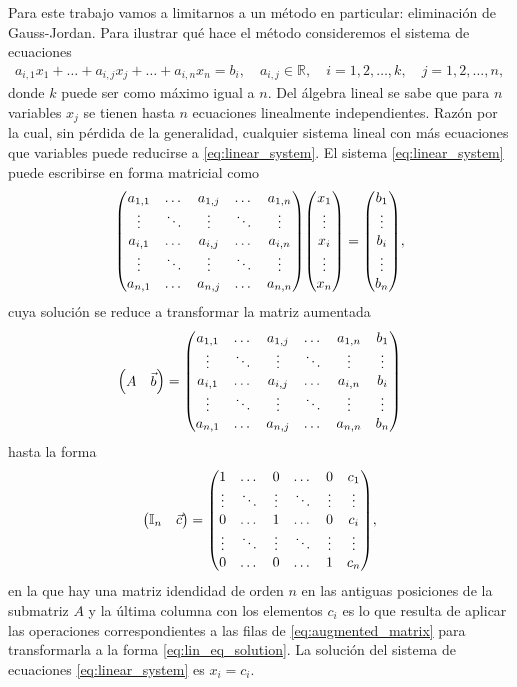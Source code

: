 \documentclass[11pt,letterpaper]{article}
\begin{document}
Para este trabajo vamos a limitarnos a un método en particular: eliminación de
Gauss-Jordan. Para ilustrar qué hace el método consideremos el sistema de ecuaciones
\begin{align}\label{eq:linear_system}
a_{i,1}x_1+\ldots+a_{i,j}x_j+\ldots+a_{i,n}x_n=b_{i}, 
\quad a_{i,j}\in \mathbb{R},\quad
i=1,2,\ldots,k,\quad j=1,2,\ldots,n,
\end{align}
donde $k$ puede ser como máximo igual a $n$.
Del álgebra lineal se sabe que para $n$ variables $x_j$ se tienen hasta $n$
ecuaciones linealmente independientes. Razón por la cual, sin pérdida de la
generalidad, cualquier sistema lineal con más ecuaciones que variables puede
reducirse a \eqref{eq:linear_system}. El sistema \eqref{eq:linear_system}
puede escribirse en forma matricial como 
\begin{align}
\mqty(a_{1,1}&\dots&a_{1,j}&\dots&a_{1,n}\\
\vdots&\ddots&\vdots&\ddots&\vdots\\
a_{i,1}&\dots&a_{i,j}&\dots&a_{i,n}\\
\vdots&\ddots&\vdots&\ddots&\vdots\\
a_{n,1}&\dots&a_{n,j}&\dots&a_{n,n})
\mqty(x_1\\ \vdots\\ x_i\\ \vdots\\ x_n)=
\mqty(b_1\\ \vdots\\ b_i\\ \vdots\\ b_n),
\end{align}
cuya solución se reduce a transformar la matriz aumentada
\begin{align}\label{eq:augmented_matrix}
\mqty(A&\vec b)=\mqty(a_{1,1}&\dots&a_{1,j}&\dots&a_{1,n}&b_1\\
\vdots&\ddots&\vdots&\ddots&\vdots&\vdots\\
a_{i,1}&\dots&a_{i,j}&\dots&a_{i,n}&b_i\\
\vdots&\ddots&\vdots&\ddots&\vdots&\vdots\\
a_{n,1}&\dots&a_{n,j}&\dots&a_{n,n}&b_n)
\end{align}
hasta la forma
\begin{align}\label{eq:lin_eq_solution}
\mqty(\mathbb{I}_n&\vec c)=
\mqty(1&\dots&0&\dots&0&c_1\\
\vdots&\ddots&\vdots&\ddots&\vdots&\vdots\\
0&\dots&1&\dots&0&c_i\\
\vdots&\ddots&\vdots&\ddots&\vdots&\vdots\\
0&\dots&0&\dots&1&c_n),
\end{align}
en la que hay una matriz idendidad de orden $n$ en las antiguas posiciones 
de la submatriz $A$ y la última columna con los elementos $c_i$ es lo
que resulta de aplicar las operaciones correspondientes a las filas de 
\eqref{eq:augmented_matrix} para transformarla a la forma \eqref{eq:lin_eq_solution}.
La solución del sistema de ecuaciones \eqref{eq:linear_system} es
$x_i=c_i$.
\end{document}
